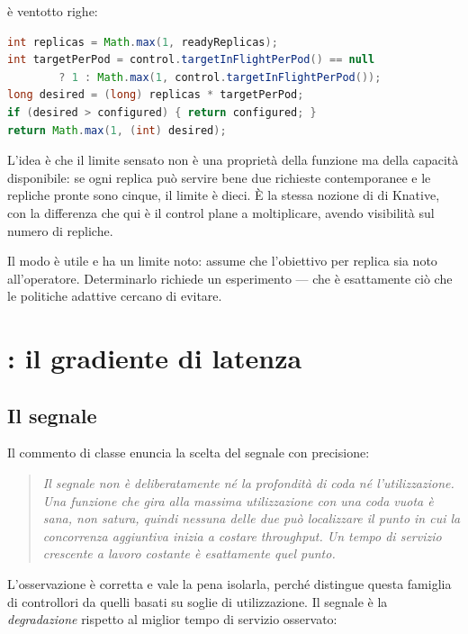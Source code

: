  \`e ventotto righe:

\begin{lstlisting}[language=Java]
int replicas = Math.max(1, readyReplicas);
int targetPerPod = control.targetInFlightPerPod() == null
        ? 1 : Math.max(1, control.targetInFlightPerPod());
long desired = (long) replicas * targetPerPod;
if (desired > configured) { return configured; }
return Math.max(1, (int) desired);
\end{lstlisting}

L'idea \`e che il limite sensato non \`e una propriet\`a della funzione ma della
capacit\`a disponibile: se ogni replica pu\`o servire bene due richieste
contemporanee e le repliche pronte sono cinque, il limite \`e dieci. \`E la
stessa nozione di  di Knative, con la differenza che
qui \`e il control plane a moltiplicare, avendo visibilit\`a sul numero di
repliche.

Il modo \`e utile e ha un limite noto: assume che l'obiettivo per replica sia
noto all'operatore. Determinarlo richiede un esperimento --- che \`e esattamente
ci\`o che le politiche adattive cercano di evitare.

\section{: il gradiente di latenza}

\subsection{Il segnale}

Il commento di classe enuncia la scelta del segnale con precisione:

\begin{quote}\itshape
Il segnale non \`e deliberatamente n\'e la profondit\`a di coda n\'e
l'utilizzazione. Una funzione che gira alla massima utilizzazione con una coda
vuota \`e sana, non satura, quindi nessuna delle due pu\`o localizzare il punto in
cui la concorrenza aggiuntiva inizia a costare throughput. Un tempo di servizio
crescente a lavoro costante \`e esattamente quel punto.
\end{quote}

L'osservazione \`e corretta e vale la pena isolarla, perch\'e distingue questa
famiglia di controllori da quelli basati su soglie di utilizzazione. Il segnale
\`e la \emph{degradazione} rispetto al miglior tempo di servizio osservato:

